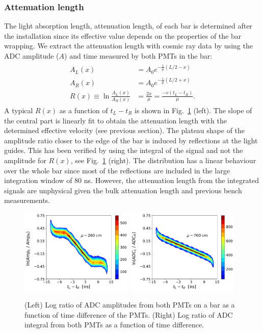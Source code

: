\documentclass[3p,final,twocolumn]{elsarticle}
\begin{document}
\subsubsection{Attenuation length}
The light absorption length, attenuation length, of each bar is determined after the installation since its effective value depends on the properties of the bar wrapping.
We extract the attenuation length with cosmic ray data by using the 
ADC amplitude ($A$) and time measured by both PMTs in the bar:
\begin{eqnarray}
	\begin{split}
		A_L(x) &= A_0 e^{-\frac{1}{\mu}\left(L/2-x\right) }				\\
		A_R(x) &= A_0 e^{-\frac{1}{\mu}\left(L/2+x\right) }				\\
		R(x) \equiv \ln{\frac{A_L(x)}{A_R(x)}} &= \frac{2x}{\mu} = \frac{-v(t_{L}-t_{R})}{\mu}.			
		 \label{eqn:atten}
	\end{split}
\end{eqnarray}
A typical $R(x)$ as a function of $t_{L}-t_{R}$ is shown in Fig.~\ref{fig:atten} (left). 
The slope of the central part is linearly fit to obtain the attenuation length with the determined effective velocity (see previous section).
The plateau shape of the amplitude ratio closer to the edge of the bar is induced by reflections at the light guides. This has been verified by
using the integral of the signal and not the amplitude for $R(x)$, see Fig.~\ref{fig:atten} (right). The distribution has a linear behaviour over the whole bar since most of the reflections are included in the large integration window of 80 \si{\nano\s}. However, the attenuation length from the integrated signals are unphysical given the bulk attenuation length and previous bench measurements. 

\begin{figure}[tb]
	\centering
		\includegraphics[width=0.48\textwidth]{atten-amp.pdf}
		\includegraphics[width=0.48\textwidth]{atten-adc.pdf}
	\caption{(Left) Log ratio of ADC amplitudes from both PMTs on a bar as a function of time difference of the PMTs. (Right) Log ratio of ADC integral from both PMTs as a function of time difference.}
	\label{fig:atten}
\end{figure}
\end{document}
